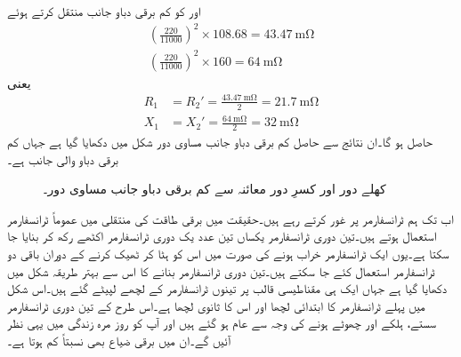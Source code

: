  اور  کو کم برقی دباو جانب منتقل کرتے ہوئے 
\begin{align*}
\left(\frac{220}{11000} \right)^2 \times 108.68=\SI{43.47}{\milli \ohm}\\
\left(\frac{220}{11000} \right)^2 \times 160=\SI{64}{\milli \ohm}
\end{align*}
یعنی
\begin{align*}
R_1&=R_2'=\frac{\SI{43.47}{\milli \ohm}}{2}=\SI{21.7}{\milli \ohm}\\
X_1&=X_2'=\frac{\SI{64}{\milli \ohm}}{2}=\SI{32}{\milli \ohm}
\end{align*}
حاصل ہو گا۔ان نتائج سے حاصل کم برقی دباو جانب مساوی دور شکل  میں دکھایا گیا ہے جہاں  کم برقی دباو والی جانب ہے۔
\begin{figure}
\centering
\caption{کھلے دور اور کسرِ دور معائنہ سے کم برقی دباو جانب  مساوی دور۔}
\label{شکل_ٹرانسفارمر_کھلے_سرے_کسر_دور_مثال}
\end{figure}
%
اب تک ہم   ٹرانسفارمر پر غور کرتے رہے ہیں۔حقیقت میں برقی طاقت کی منتقلی میں عموماً  ٹرانسفارمر استعمال ہوتے ہیں۔تین دوری ٹرانسفارمر یکساں تین عدد  یک دوری  ٹرانسفارمر اکٹھے رکھ کر بنایا جا سکتا ہے۔یوں  ایک ٹرانسفارمر خراب ہونے کی صورت میں  اس کو ہٹا کر ٹھیک کرنے کے دوران  باقی دو ٹرانسفارمر استعمال  کئے جا سکتے ہیں۔تین دوری ٹرانسفارمر بنانے کا اس سے بہتر طریقہ شکل  میں دکھایا گیا ہے جہاں ایک ہی مقناطیسی قالب پر تینوں ٹرانسفارمر کے لچھے لپیٹے گئے ہیں۔اس شکل میں  پہلے ٹرانسفارمر کا ابتدائی لچھا اور  اس کا ثانوی لچھا ہے۔اس طرح کے تین دوری ٹرانسفارمر سستے، ہلکے اور چھوٹے ہونے کی وجہ سے عام ہو گئے ہیں اور آپ کو روز مرہ زندگی میں یہی نظر آئیں گے۔ان میں برقی ضیاع بھی نسبتاً  کم ہوتا ہے۔
